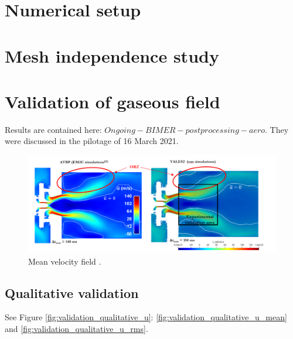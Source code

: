 \section{Numerical setup}

\section{Mesh independence study}

\section{Validation of gaseous field}

Results are contained here: $Ongoing - BIMER - postprocessing - aero$. They were discussed in the pilotage of 16 March 2021.


\begin{figure}[h!]
	\centering
	\includegraphics[scale=0.7]{./part3_applications/figures_aero/quantitative_view_mean_velocity_field}
	\caption{Mean velocity field .}
	\label{fig:quantitative_view_mean_velocity_field}
\end{figure}


\subsection{Qualitative validation}


See Figure \ref{fig:validation_qualitative_u}: \ref{fig:validation_qualitative_u_mean} and \ref{fig:validation_qualitative_u_rms}.


